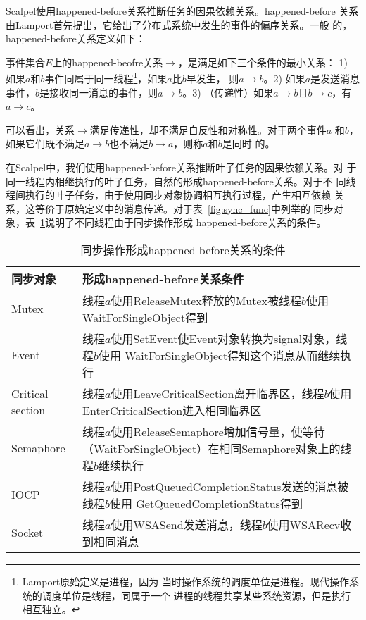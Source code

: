 Scalpel使用happened-before关系推断任务的因果依赖关系。happened-before
关系由Lamport首先提出，它给出了分布式系统中发生的事件的偏序关系。一般
的，happened-before关系定义如下：

\begin{definition}

事件集合$E$上的happened-beofre关系$\to$，是满足如下三个条件的最小关系：
1) 如果$a$和$b$事件同属于同一线程\footnote{Lamport原始定义是进程，因为
当时操作系统的调度单位是进程。现代操作系统的调度单位是线程，同属于一个
进程的线程共享某些系统资源，但是执行相互独立。}，如果$a$比$b$早发生，
则$a \to b$。2) 如果$a$是发送消息事件，$b$是接收同一消息的事件，则$a
\to b$。3) （传递性）如果$a \to b$且$b \to c$，有$a \to c$。

\end{definition}

可以看出，关系$\to$满足传递性，却不满足自反性和对称性。对于两个事件$a$
和$b$，如果它们既不满足$a \to b$也不满足$b \to a$，则称$a$和$b$是同时
的。

在Scalpel中，我们使用happened-before关系推断叶子任务的因果依赖关系。对
于同一线程内相继执行的叶子任务，自然的形成happened-before关系。对于不
同线程间执行的叶子任务，由于使用同步对象协调相互执行过程，产生相互依赖
关系，这等价于原始定义中的消息传递。对于表~\ref{fig:sync_func}中列举的
同步对象，表~\ref{fig:sync_dependency}说明了不同线程由于同步操作形成
happened-before关系的条件。

\begin{table}[htbp]
\centering
\begin{minipage}{0.8\linewidth}
\centering
\caption{同步操作形成happened-before关系的条件}
\label{fig:sync_dependency}
\begin{tabular}{lp{8cm}}

\toprule[1.5pt]
同步对象 & 形成happened-before关系条件 \\
\midrule[1pt]
Mutex & 线程$a$使用ReleaseMutex释放的Mutex被线程$b$使用
WaitForSingleObject得到 \\

\midrule[1pt]
Event & 线程$a$使用SetEvent使Event对象转换为signal对象，线程$b$使用
WaitForSingleObject得知这个消息从而继续执行 \\

\midrule[1pt]
Critical section & 线程$a$使用LeaveCriticalSection离开临界区，线程$b$使用
EnterCriticalSection进入相同临界区 \\

\midrule[1pt]
Semaphore & 线程$a$使用ReleaseSemaphore增加信号量，使等待
（WaitForSingleObject）在相同Semaphore对象上的线程$b$继续执行 \\

\midrule[1pt]
IOCP & 线程$a$使用PostQueuedCompletionStatus发送的消息被线程$b$使用
GetQueuedCompletionStatus得到 \\

\midrule[1pt]
Socket & 线程$a$使用WSASend发送消息，线程$b$使用WSARecv收到相同消息 \\

\bottomrule[1.5pt]
\end{tabular}
\end{minipage}
\end{table}

